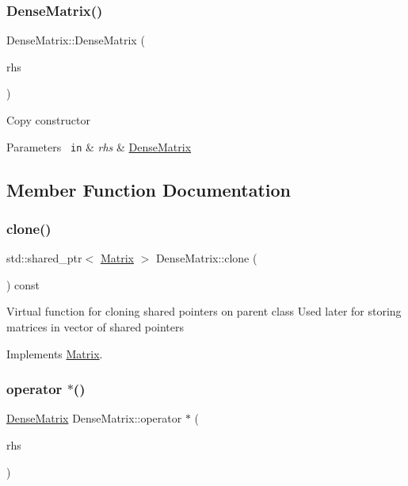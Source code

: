 \subsubsection{\texorpdfstring{DenseMatrix()}{DenseMatrix()}\hspace{0.1cm}{\footnotesize\ttfamily [2/2]}}
{\footnotesize\ttfamily Dense\+Matrix\+::\+Dense\+Matrix (\begin{DoxyParamCaption}\item[{const \mbox{\hyperlink{class_dense_matrix}{Dense\+Matrix}} \&}]{rhs }\end{DoxyParamCaption})}

Copy constructor 
\begin{DoxyParams}[1]{Parameters}
\mbox{\texttt{ in}}  & {\em rhs} & \mbox{\hyperlink{class_dense_matrix}{Dense\+Matrix}} \\
\hline
\end{DoxyParams}


\subsection{Member Function Documentation}
\mbox{\label{class_dense_matrix_af6334f6106e2de277daf5affabdca1da}} 
\subsubsection{\texorpdfstring{clone()}{clone()}}
{\footnotesize\ttfamily std\+::shared\+\_\+ptr$<$ \mbox{\hyperlink{class_matrix}{Matrix}} $>$ Dense\+Matrix\+::clone (\begin{DoxyParamCaption}{ }\end{DoxyParamCaption}) const\hspace{0.3cm}{\ttfamily [virtual]}}

Virtual function for cloning shared pointers on parent class Used later for storing matrices in vector of shared pointers 

Implements \mbox{\hyperlink{class_matrix_aae61e88849e7c16bc9fabf0ad5bd20f0}{Matrix}}.

\mbox{\label{class_dense_matrix_a30fc03840fabac76fe035538d3dd979b}} 
\subsubsection{\texorpdfstring{operator $\ast$()}{operator *()}\hspace{0.1cm}{\footnotesize\ttfamily [1/2]}}
{\footnotesize\ttfamily \mbox{\hyperlink{class_dense_matrix}{Dense\+Matrix}} Dense\+Matrix\+::operator $\ast$ (\begin{DoxyParamCaption}\item[{const \mbox{\hyperlink{class_dense_matrix}{Dense\+Matrix}} \&}]{rhs }\end{DoxyParamCaption})}

